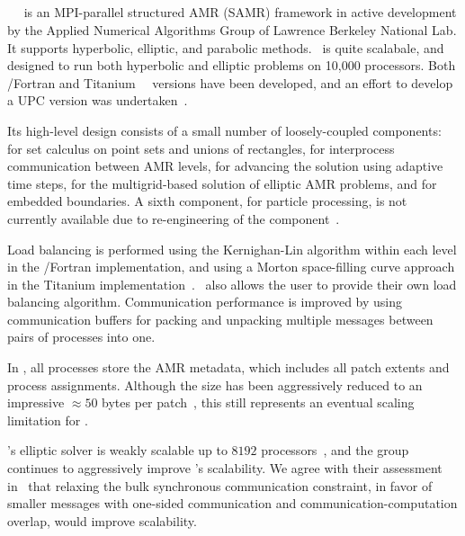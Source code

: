 \documentclass[10pt,twocolumn]{article}
\begin{document}
\subsection{\chombo} \label{ss:chombo}

\chombo~\cite{wwwchombo}~\cite{CoGr09} is an MPI-parallel structured
AMR (SAMR) framework in active development by the Applied Numerical
Algorithms Group of Lawrence Berkeley National Lab.  It supports
hyperbolic, elliptic, and parabolic methods.  \chombo\ is quite
scalabale, and designed to run both hyperbolic and elliptic problems
on 10,000 processors.  Both \cpp/Fortran and
Titanium~\cite{wwwtitanium}~\cite{YeSe98} versions have been
developed, and an effort to develop a UPC version was
undertaken~\cite{We04}.

Its high-level design consists of a small number of loosely-coupled
components:  for set calculus on point sets and unions
of rectangles,  for interprocess communication between
AMR levels,  for advancing the solution using
adaptive time steps,  for the multigrid-based
solution of elliptic AMR problems, and  for embedded
boundaries.  A sixth component,  for particle
processing, is not currently available due to re-engineering of the
component~\cite{wwwchombo}.

Load balancing is performed using the Kernighan-Lin algorithm within
each level in the \cpp/Fortran implementation, and using a Morton
space-filling curve approach in the Titanium
implementation~\cite{WeSu07}.  \chombo\ also allows the user to
provide their own load balancing algorithm.  Communication performance
is improved by using communication buffers for packing and unpacking
multiple messages between pairs of processes into one.

In \chombo, all processes store the AMR metadata, which includes all
patch extents and process assignments.  Although the size has been
aggressively reduced to an impressive $\approx 50$ bytes per
patch~\cite{CoBe07}, this still represents an eventual scaling
limitation for \chombo.

\chombo's elliptic solver is weakly scalable up to $8192$
processors~\cite{WeSu07}, and the group continues to aggressively
improve \chombo's scalability.  We agree with their assessment
in~\cite{WeSu07} that relaxing the bulk synchronous communication
constraint, in favor of smaller messages with one-sided communication
and communication-computation overlap, would improve scalability.
\end{document}
